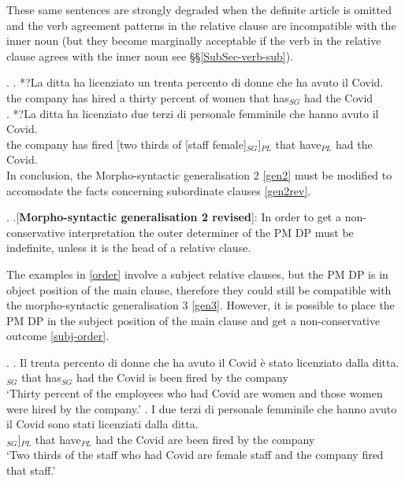 \documentclass[charis, linguex]{glossa}
\begin{document}
These same sentences are strongly degraded when the definite article is omitted and the verb agreement patterns in the relative clause are incompatible with the inner noun (but they become marginally acceptable if the verb in the relative clause agrees with the inner noun see \S\S\ref{SubSec-verb-sub}). 

\ex. \ag. *?La ditta ha licenziato un trenta percento di donne che ha avuto il Covid.\\ 
	  the company has hired a thirty percent of women that has$_{SG}$ had the Covid\\
\bg. *?La ditta ha licenziato due terzi di personale femminile che hanno avuto il Covid. \\
	  the company has fired [two thirds of [staff female]$_{SG}$]$_{PL}$ that have$_{PL}$ had the Covid.\\ 
	  
	  
In conclusion, the Morpho-syntactic generalisation 2 \ref{gen2} must be modified to accomodate the facts concerning subordinate clauses \ref{gen2rev}.

\ex. \label{gen2rev} \a.[{\bf Morpho-syntactic generalisation 2 revised}]: In order to get a non-conservative interpretation the outer determiner of the PM DP must be indefinite, unless it is the head of a relative clause.

The examples in \ref{order} involve a subject relative clauses, but the PM DP is in object position of the main clause, therefore they could still be compatible with the morpho-syntactic generalisation 3 \ref{gen3}. However, it is possible to place the PM DP in the subject position of the main clause and get a non-conservative outcome \ref{subj-order}. 

\ex. \label{subj-order} \ag. Il trenta percento di donne che ha avuto il Covid è stato licenziato dalla ditta.\\ 
	 [the thirty percent of women$_{PL}$]$_{SG}$ that has$_{SG}$ had the Covid is been fired {by the} company\\
	\glt  `Thirty percent of the employees who had Covid are women and those women were hired by the company.'  
\bg. I due terzi di personale femminile che hanno avuto il Covid sono stati licenziati dalla ditta. \\
   	 [the two thirds of [staff female]$_{SG}$]$_{PL}$ that have$_{PL}$ had the Covid are been fired {by the} company \\ 
   	\glt `Two thirds of the staff who had Covid are female staff and the company fired that staff.' 
  
\end{document}
